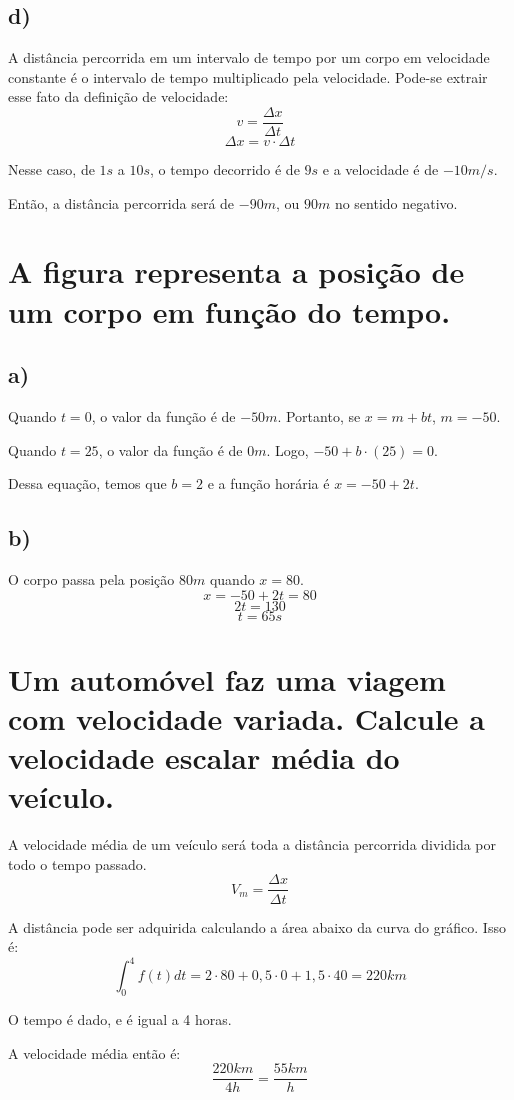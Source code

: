 \documentclass[a4paper]{article}
\begin{document}
\subsection{d)}
\hspace{\parindent}A distância percorrida em um intervalo de tempo por um corpo em velocidade constante é o intervalo de tempo multiplicado pela velocidade. Pode-se extrair esse fato da definição de velocidade:
\[v=\frac{\Delta x}{\Delta t}\]
\[\Delta x = v\cdot \Delta t\]
\par Nesse caso, de \(1s\) a \(10s\), o tempo decorrido é de \(9s\) e a velocidade é de \(-10m/s\). 
\par Então, a distância percorrida será de \(-90m\), ou \(90m\) no sentido negativo.


\section{A figura representa a posição de um corpo em função do tempo.}

\subsection{a)}
\hspace{\parindent}Quando \(t=0\), o valor da função é de \(-50m\). Portanto, se \(x=m+bt\), \(m=-50\).
\par Quando \(t=25\), o valor da função é de \(0m\). Logo, \(-50+b\cdot(25)=0\).
\par Dessa equação, temos que \(b=2\) e a função horária é \(x=-50+2t\).

\subsection{b)}
\hspace{\parindent}O corpo passa pela posição \(80m\) quando \(x=80\).
\[x=-50+2t=80\]
\[2t=130\]
\[t=65s\]

\section{Um automóvel faz uma viagem com velocidade variada. Calcule a velocidade escalar média do veículo.}
\hspace{\parindent}A velocidade média de um veículo será toda a distância percorrida dividida por todo o tempo passado.
\[V_m = \frac{\Delta x}{\Delta t}\]
\par A distância pode ser adquirida calculando a área abaixo da curva do gráfico. Isso é:
\[\int_0^4{f(t)}dt=2\cdot80 + 0,5\cdot0+1,5\cdot40=220km\]
\par O tempo é dado, e é igual a 4 horas.
\par A velocidade média então é:
\[\frac{220km}{4h}=\frac{55km}{h}\]
\end{document}
